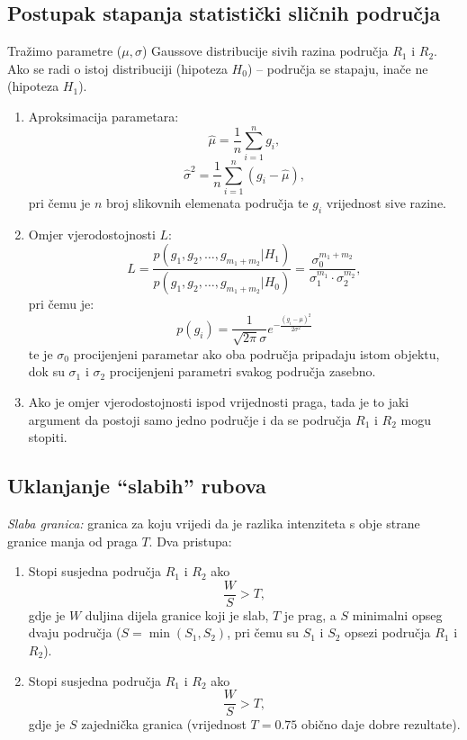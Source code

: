 \documentclass[11pt,english]{article}
\begin{document}
\subsection{Postupak stapanja statistički sličnih područja}
Tražimo parametre ($\mu, \sigma$) Gaussove distribucije sivih razina područja $R_1$ i $R_2$. Ako se radi o istoj distribuciji (hipoteza $H_0$) -- područja se stapaju, inače ne (hipoteza $H_1$).
\begin{enumerate}
	\item Aproksimacija parametara:
	$$\hat \mu = \frac{1}{n}\sum_{i=1}^n g_i,$$
	$$\hat \sigma^2 = \frac{1}{n}\sum_{i=1}^n \left (g_i-\hat \mu\right ),$$
	pri čemu je $n$ broj slikovnih elemenata područja te $g_i$ vrijednost sive razine.
	\item Omjer vjerodostojnosti $L$:
	$$L = \frac{p\left (g_1, g_2, \ldots, g_{m_1+m_2} \vert H_1 \right )}{p\left (g_1, g_2, \ldots, g_{m_1+m_2} \vert H_0 \right )} = \frac{\sigma_0^{m_1+m_2}}{\sigma_1^{m_1} \cdot \sigma_2^{m_2}},$$
	pri čemu je:
	$$p(g_i) = \frac{1}{\sqrt{2\pi}\sigma}e^{-\frac{(g_i-\mu)^2}{2\sigma^2}}$$
	te je $\sigma_0$ procijenjeni parametar ako oba područja pripadaju istom objektu, dok su $\sigma_1$ i $\sigma_2$ procijenjeni parametri svakog područja zasebno.
	\item Ako je omjer vjerodostojnosti ispod vrijednosti praga, tada je to jaki argument da postoji samo jedno područje i da se područja $R_1$ i $R_2$ mogu stopiti.
\end{enumerate}

\subsection{Uklanjanje ``slabih'' rubova}
\emph{Slaba granica:} granica za koju vrijedi da je razlika intenziteta s obje strane granice manja od praga $T$. Dva pristupa:
\begin{enumerate}
	\item Stopi susjedna područja $R_1$ i $R_2$ ako
	$$\frac{W}{S} > T,$$
	gdje je $W$ duljina dijela granice koji je slab, $T$ je prag, a $S$ minimalni opseg dvaju područja ($S = \min(S_1, S_2)$, pri čemu su $S_1$ i $S_2$ opsezi područja $R_1$ i $R_2$).
	\item Stopi susjedna područja $R_1$ i $R_2$ ako
	$$\frac{W}{S} > T,$$
	gdje je $S$ zajednička granica  (vrijednost $T = 0.75$ obično daje dobre rezultate).
\end{enumerate}
\end{document}
